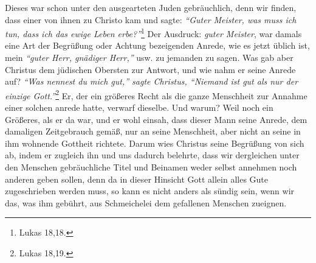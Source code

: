 Dieses war schon unter den ausgearteten Juden
gebräuchlich, denn wir finden, dass
einer von ihnen zu Christo kam und sagte:
\textit{"`Guter Meister, was muss ich tun,
dass ich das ewige Leben erbe?"'}\footnote{Lukas 18,18.}
Der Ausdruck: \textit{guter
Meister}, war damals eine Art der Begrüßung oder Achtung bezeigenden Anrede, wie
es jetzt üblich ist, mein \textit{"`guter Herr, gnädiger Herr,"'} usw. zu
jemanden zu
sagen. Was gab aber Christus dem jüdischen Obersten zur Antwort, und wie nahm er
seine Anrede auf?
\textit{"`Was nennest du mich gut,"' sagte Christus, "`Niemand ist gut
als nur der einzige Gott."'}\footnote{Lukas 18,19.} Er, der ein größeres Recht
als
die ganze Menschheit zur Annahme einer solchen anrede hatte, verwarf dieselbe.
Und warum? Weil noch ein Größeres, als er da war, und er wohl einsah, dass
dieser Mann seine Anrede, dem damaligen Zeitgebrauch gemäß, nur an seine
Menschheit, aber nicht an seine in ihm wohnende Gottheit richtete.
Darum wies
Christus seine Begrüßung von sich ab, indem er zugleich ihn und uns dadurch
belehrte, dass wir dergleichen unter den Menschen gebräuchliche Titel und
Beinamen weder selbst annehmen noch anderen geben sollen, denn da in dieser
Hinsicht Gott allein alles Gute zugeschrieben werden muss, so kann es nicht
anders als sündig sein, wenn wir das, was ihm gebührt, aus Schmeichelei dem
gefallenen Menschen zueignen.

\medskip

